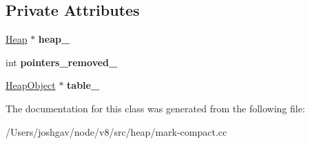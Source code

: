 \subsection*{Private Attributes}
\begin{DoxyCompactItemize}
\item 
\hyperlink{classv8_1_1internal_1_1_heap}{Heap} $\ast$ {\bfseries heap\+\_\+}\hypertarget{classv8_1_1internal_1_1_string_table_cleaner_ad6e73347ab6e0c7f8929df027d35dda1}{}\label{classv8_1_1internal_1_1_string_table_cleaner_ad6e73347ab6e0c7f8929df027d35dda1}

\item 
int {\bfseries pointers\+\_\+removed\+\_\+}\hypertarget{classv8_1_1internal_1_1_string_table_cleaner_ad7373dd53244585708d103bbf7593070}{}\label{classv8_1_1internal_1_1_string_table_cleaner_ad7373dd53244585708d103bbf7593070}

\item 
\hyperlink{classv8_1_1internal_1_1_heap_object}{Heap\+Object} $\ast$ {\bfseries table\+\_\+}\hypertarget{classv8_1_1internal_1_1_string_table_cleaner_ab3e8879a3e096494ac44be499e81e943}{}\label{classv8_1_1internal_1_1_string_table_cleaner_ab3e8879a3e096494ac44be499e81e943}

\end{DoxyCompactItemize}


The documentation for this class was generated from the following file\+:\begin{DoxyCompactItemize}
\item 
/\+Users/joshgav/node/v8/src/heap/mark-\/compact.\+cc\end{DoxyCompactItemize}
